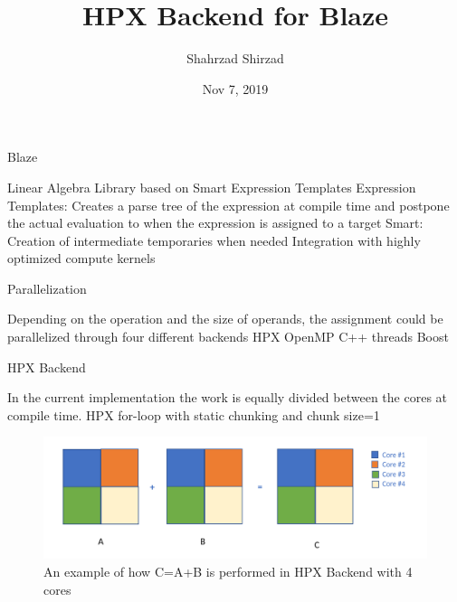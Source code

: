 \documentclass[10pt]{beamer}
\title{HPX Backend for Blaze}
\author{Shahrzad Shirzad}
\date{Nov 7, 2019}
\begin{document}
\maketitle



\begin{frame}{Blaze}
\begin{outline}
 Linear Algebra Library based on Smart Expression Templates
 \1Expression Templates:
	\2Creates a parse tree of the expression at compile time and postpone the actual evaluation to when the expression is assigned to a target
\1 Smart: 
	\2Creation of intermediate temporaries when needed
	\2Integration with highly optimized compute kernels
\end{outline}
\end{frame}


\begin{frame}{Parallelization}
	\begin{outline}
		Depending on the operation and the size of operands, the assignment could be parallelized through four different backends
		\1 HPX 
		\1OpenMP
		\1C++ threads
		\1Boost
	\end{outline}
\end{frame}

\begin{frame}{HPX Backend}
	\begin{outline}
		In the current implementation the work is equally divided between the cores at compile time.
		\1 HPX for-loop with static chunking and chunk size=1
		\begin{figure}
			\centering
			\includegraphics[width=0.72\linewidth]{figures/old_backend.png}
			\caption{An example of how C=A+B is performed in HPX Backend with 4 cores}	
		\end{figure}	

	\end{outline}
\end{frame}
\end{document}
